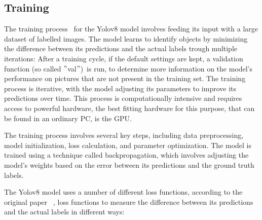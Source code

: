 \subsection{Training}\label{subsec:training}
The training process~\cite{redmon2016lookonceunifiedrealtime} for the Yolov8 model involves feeding its input with a large dataset of labelled images.
The model learns to identify objects by minimizing the difference between its predictions and the actual labels trough multiple iterations:
After a training cycle, if the default settings are kept, a validation function (so called \("\)val\("\))\ is run,
to determine more information on the model's performance on pictures that are not present in the training set.
The training process is iterative, with the model adjusting its parameters to improve its predictions over time.
This process is computationally intensive and requires access to powerful hardware,
the best fitting hardware for this purpose, that can be found in an ordinary PC, is the GPU\@.

The training process involves several key steps, including data preprocessing, model initialization,
loss calculation, and parameter optimization.
The model is trained using a technique called backpropagation, which involves adjusting the model's weights based on
the error between its predictions and the ground truth labels.

The Yolov8 model uses a number of different loss functions, according to the original paper~\cite{redmon2016lookonceunifiedrealtime}
, loss functions to measure the difference between its predictions and the actual labels in different ways:




